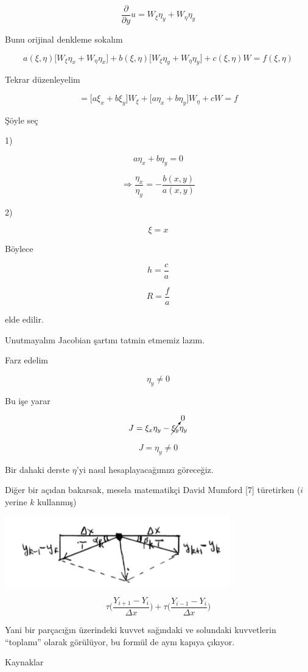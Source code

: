 \documentclass[12pt,fleqn]{article}\usepackage{../../common}
\begin{document}
$$ \frac{\partial }{\partial y}u =
W_\xi\eta_y + W_\eta\eta_y
 $$

Bunu orijinal denkleme sokalım 

$$ 
a(\xi,\eta) \bigg[W_\xi \eta_x + W_\eta\eta_x \bigg] +
b(\xi,\eta) \bigg[W_\xi \eta_y + W_\eta\eta_y  \bigg] + 
c(\xi,\eta)W = f(\xi,\eta)
 $$

Tekrar düzenleyelim

$$ = 
\bigg[ a\xi_x + b\xi_y \bigg] W_\xi + 
\bigg[ a\eta_x + b\eta_y \bigg] W_\eta +
cW = f
 $$

Şöyle seç

1)

$$ a \eta_x + b \eta_y = 0 $$

$$ \Rightarrow \frac{\eta_x}{\eta_y} = -\frac{b(x,y)}{a(x,y)}$$

2)

$$ \xi = x $$

Böylece 

$$ h = \frac{c}{a} $$

$$ R = \frac{f}{a} $$

elde edilir. 

Unutmayalım Jacobian şartını tatmin etmemiz lazım. 

Farz edelim 

$$ \eta_y \ne 0 $$

Bu işe yarar 

$$ J = \xi_x\eta_y - \cancelto{0}{\xi_y}\eta_y $$

$$ J = \eta_y \ne 0 $$

Bir dahaki derste $\eta$'yi nasıl hesaplayacağımızı göreceğiz. 

Diğer bir açıdan bakarsak, mesela matematikçi David Mumford [7] türetirken ($i$
yerine $k$ kullanmış)

\includegraphics[height=3cm]{1_15.png}

$$ 
\tau \bigg( \frac{Y_{i+1}- Y_i}{\Delta x} \bigg) +
\tau \bigg( \frac{Y_{i-1}- Y_{i}}{\Delta x} \bigg) 
$$

Yani bir parçacığın üzerindeki kuvvet sağındaki ve solundaki kuvvetlerin
``toplamı'' olarak görülüyor, bu formül de aynı kapıya çıkıyor.

Kaynaklar
\end{document}
